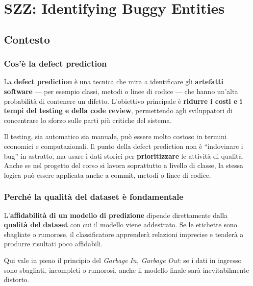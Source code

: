 \chapter{SZZ: Identifying Buggy Entities}

\section{Contesto}

\subsection{Cos'è la defect prediction}

La \textbf{defect prediction} è una tecnica che mira a identificare gli \textbf{artefatti software} --- per esempio classi, metodi o linee di codice --- che hanno un'alta probabilità di contenere un difetto. L'obiettivo principale è \textbf{ridurre i costi e i tempi del testing e della code review}, permettendo agli sviluppatori di concentrare lo sforzo sulle parti più critiche del sistema.

\begin{notaprof}
Il testing, sia automatico sia manuale, può essere molto costoso in termini economici e computazionali. Il punto della defect prediction non è ``indovinare i bug'' in astratto, ma usare i dati storici per \textbf{prioritizzare} le attività di qualità. Anche se nel progetto del corso si lavora soprattutto a livello di classe, la stessa logica può essere applicata anche a commit, metodi o linee di codice.
\end{notaprof}

\subsection{Perché la qualità del dataset è fondamentale}

L'\textbf{affidabilità di un modello di predizione} dipende direttamente dalla \textbf{qualità del dataset} con cui il modello viene addestrato. Se le etichette sono sbagliate o rumorose, il classificatore apprenderà relazioni imprecise e tenderà a produrre risultati poco affidabili.

\begin{notaprof}
Qui vale in pieno il principio del \emph{Garbage In, Garbage Out}: se i dati in ingresso sono sbagliati, incompleti o rumorosi, anche il modello finale sarà inevitabilmente distorto.
\end{notaprof}

